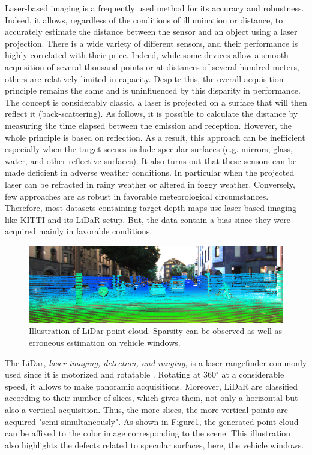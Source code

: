 Laser-based imaging is a frequently used method for its accuracy and robustness. Indeed, it allows, regardless of the conditions of illumination or distance, to accurately estimate the distance between the sensor and an object using a laser projection.
There is a wide variety of different sensors, and their performance is highly correlated with their price. Indeed, while some devices allow a smooth acquisition of several thousand points or at distances of several hundred meters, others are relatively limited in capacity. Despite this, the overall acquisition principle remains the same and is uninfluenced by this disparity in performance.
The concept is considerably classic, a laser is projected on a surface that will then reflect it (back-scattering). As follows, it is possible to calculate the distance by measuring the time elapsed between the emission and reception. 
However, the whole principle is based on reflection. As a result, this approach can be inefficient especially when the target scenes include specular surfaces \cite{hrabar2012evaluation} (e.g. mirrors, glass, water, and other reflective surfaces).
It also turns out that these sensors can be made deficient in adverse weather conditions. In particular when the projected laser can be refracted in rainy weather or altered in foggy weather.
Conversely, few approaches are as robust in favorable meteorological circumstances. Therefore, most datasets containing target depth maps use laser-based imaging like KITTI\cite{Geiger2012CVPR,Menze2015CVPR,Fritsch2013ITSC} and its LiDaR setup. But, the data contain a bias since they were acquired mainly in favorable conditions.

\begin{figure}[h]
	\centering
	\includegraphics[width=0.8\linewidth]{Figures/SOA/lidar-ill}
	\caption[Illustration of LiDar point-cloud.]{Illustration of LiDar point-cloud\footnotemark. Sparsity can be observed as well as erroneous estimation on vehicle windows.}
	\label{lidar-ill}
\end{figure}



The LiDar, \emph{laser imaging, detection, and ranging}, is a laser rangefinder commonly used since it is motorized and rotatable \cite{wang20133d}. Rotating at 360$^\circ$ at a considerable speed, it allows to make panoramic acquisitions. Moreover, LiDaR are classified according to their number of slices, which gives them, not only a horizontal but also a vertical acquisition. Thus, the more slices, the more vertical points are acquired "semi-simultaneously".
As shown in Figure\ref{lidar-ill}, the generated point cloud can be affixed to the color image corresponding to the scene. This illustration also highlights the defects related to specular surfaces, here, the vehicle windows.

